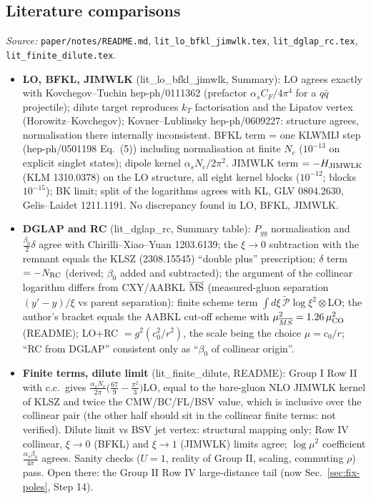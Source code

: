 \documentclass[10pt]{article}
\begin{document}
\subsection{Literature comparisons}\label{sec:calc-lit}
\noindent\emph{Source:} \texttt{paper/notes/README.md}, \texttt{lit\_lo\_bfkl\_jimwlk.tex}, \texttt{lit\_dglap\_rc.tex}, \texttt{lit\_finite\_dilute.tex}.
\begin{itemize}
\item \textbf{LO, BFKL, JIMWLK} (lit\_lo\_bfkl\_jimwlk, Summary): LO agrees exactly with Kovchegov--Tuchin hep-ph/0111362 (prefactor $\alpha_{s}C_{F}/4\pi^{4}$ for a $q\bar q$ projectile); dilute target reproduces $k_{T}$ factorisation and the Lipatov vertex (Horowitz--Kovchegov); Kovner--Lublinsky hep-ph/0609227: structure agrees, normalisation there internally inconsistent. BFKL term = one KLWMIJ step (hep-ph/0501198 Eq.~(5)) including normalisation at finite $N_{c}$ ($10^{-13}$ on explicit singlet states); dipole kernel $\alpha_{s}N_{c}/2\pi^{2}$. JIMWLK term $=-H_{\rm JIMWLK}$ (KLM 1310.0378) on the LO structure, all eight kernel blocks ($10^{-12}$; blocks $10^{-15}$); BK limit; split of the logarithms agrees with KL, GLV 0804.2630, Gelis--Laidet 1211.1191. No discrepancy found in LO, BFKL, JIMWLK.
\item \textbf{DGLAP and RC} (lit\_dglap\_rc, Summary table): $P_{gg}$ normalisation and $\frac{\beta_{0}}{2}\delta$ agree with Chirilli--Xiao--Yuan 1203.6139; the $\xi\to0$ subtraction with the remnant equals the KLSZ (2308.15545) ``double plus'' prescription; $\delta$ term $=-N_{\rm RC}$ (derived; $\beta_{0}$ added and subtracted); the argument of the collinear logarithm differs from CXY/AABKL $\overline{\rm MS}$ (measured-gluon separation $(y'-y)/\xi$ vs parent separation): finite scheme term $\int d\xi\,\widetilde{\mathcal P}\log\xi^{2}\otimes$LO; the author's bracket equals the AABKL cut-off scheme with $\mu_{\overline{MS}}^{2}=1.26\,\mu^{2}_{\rm CO}$ (README); LO+RC $=g^{2}(c_{0}^{2}/r^{2})$, the scale being the choice $\mu=c_{0}/r$; ``RC from DGLAP'' consistent only as ``$\beta_{0}$ of collinear origin''.
\item \textbf{Finite terms, dilute limit} (lit\_finite\_dilute, README): Group I Row II with c.c.\ gives $\frac{\alpha_{s}N_{c}}{2\pi}\big(\frac{67}{9}-\frac{\pi^{2}}{3}\big)$LO, equal to the bare-gluon NLO JIMWLK kernel of KLSZ and twice the CMW/BC/FL/BSV value, which is inclusive over the collinear pair (the other half should sit in the collinear finite terms: not verified). Dilute limit vs BSV jet vertex: structural mapping only; Row IV collinear, $\xi\to0$ (BFKL) and $\xi\to1$ (JIMWLK) limits agree; $\log\mu^{2}$ coefficient $\frac{\alpha_{s}\beta_{0}}{4\pi}$ agrees. Sanity checks ($U=1$, reality of Group II, scaling, commuting $\rho$) pass. Open there: the Group II Row IV large-distance tail (now Sec.~\ref{sec:fix-poles}, Step 14).
\end{itemize}
\clearpage
\end{document}
